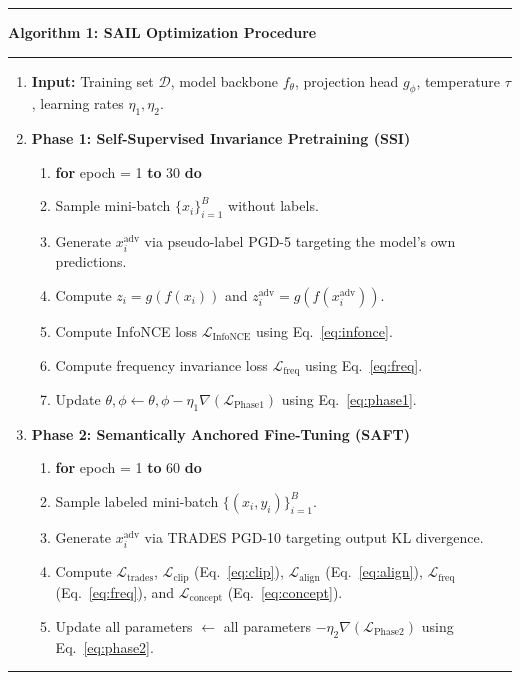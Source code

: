 \documentclass[12pt,a4paper]{article}
\begin{document}
\begin{center}
\begin{minipage}{0.95\linewidth}
\rule{\linewidth}{1pt}
\vskip 2pt
\textbf{Algorithm 1: SAIL Optimization Procedure}
\vskip 2pt
\rule{\linewidth}{0.5pt}
\begin{enumerate}[leftmargin=1.5em, itemsep=2pt]
  \item \textbf{Input:} Training set $\mathcal{D}$, model backbone $f_\theta$, projection head $g_\phi$, temperature $\tau$, learning rates $\eta_1, \eta_2$.
  \item \textbf{Phase 1: Self-Supervised Invariance Pretraining (SSI)}
  \begin{enumerate}[label=\alph*., leftmargin=1.5em]
    \item \textbf{for} epoch = 1 \textbf{to} 30 \textbf{do}
    \item \quad Sample mini-batch $\{x_i\}_{i=1}^B$ without labels.
    \item \quad Generate $x_i^{\text{adv}}$ via pseudo-label PGD-5 targeting the model's own predictions.
    \item \quad Compute $z_i = g(f(x_i))$ and $z_i^{\text{adv}} = g(f(x_i^{\text{adv}}))$.
    \item \quad Compute InfoNCE loss $\mathcal{L}_{\text{InfoNCE}}$ using Eq.~\eqref{eq:infonce}.
    \item \quad Compute frequency invariance loss $\mathcal{L}_{\text{freq}}$ using Eq.~\eqref{eq:freq}.
    \item \quad Update $\theta, \phi \leftarrow \theta, \phi - \eta_1 \nabla (\mathcal{L}_{\text{Phase1}})$ using Eq.~\eqref{eq:phase1}.
  \end{enumerate}
  \item \textbf{Phase 2: Semantically Anchored Fine-Tuning (SAFT)}
  \begin{enumerate}[label=\alph*., leftmargin=1.5em]
    \item \textbf{for} epoch = 1 \textbf{to} 60 \textbf{do}
    \item \quad Sample labeled mini-batch $\{(x_i, y_i)\}_{i=1}^B$.
    \item \quad Generate $x_i^{\text{adv}}$ via TRADES PGD-10 targeting output KL divergence.
    \item \quad Compute $\mathcal{L}_{\text{trades}}$, $\mathcal{L}_{\text{clip}}$ (Eq.~\eqref{eq:clip}), $\mathcal{L}_{\text{align}}$ (Eq.~\eqref{eq:align}), $\mathcal{L}_{\text{freq}}$ (Eq.~\eqref{eq:freq}), and $\mathcal{L}_{\text{concept}}$ (Eq.~\eqref{eq:concept}).
    \item \quad Update all parameters $\leftarrow$ all parameters $- \eta_2 \nabla (\mathcal{L}_{\text{Phase2}})$ using Eq.~\eqref{eq:phase2}.
  \end{enumerate}
\end{enumerate}
\rule{\linewidth}{1pt}
\end{minipage}
\end{center}
\end{document}
